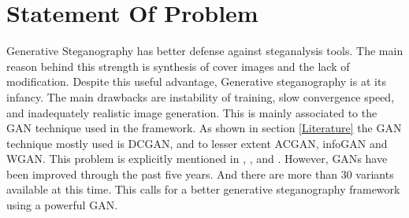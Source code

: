 \documentclass[../main/main.tex]{subfiles}
\begin{document}
	
	\section{Statement Of Problem} \label{statement}
	Generative Steganography has better defense against steganalysis tools. The main reason behind this strength is  synthesis of cover images and the lack of modification. Despite this useful advantage, Generative steganography is at its infancy. The main drawbacks are instability of training, slow convergence speed, and inadequately realistic image generation. This is mainly associated to the \gls{GAN} technique used in the framework. As shown in section \ref{Literature} the \gls{GAN} technique mostly used is \gls{DCGAN}, and to lesser extent \gls{ACGAN}, \gls{infoGAN} and \gls{WGAN}. This problem is explicitly mentioned in \cite{Hu2018}, \cite{Zhang2019}, and \cite{Ke}.
	However, \gls{GAN}s have been improved through the past five years. And there are more than 30 variants available at this time. This calls for a better generative steganography framework using a powerful \gls{GAN}.
\end{document}
